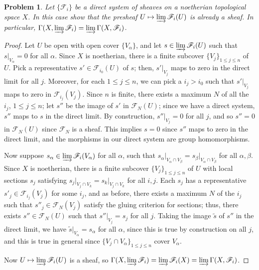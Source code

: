 \documentclass[12pt,letterpaper]{article}
\newtheorem{problem}{Problem}[section]
\theoremstyle{definition}
\theoremstyle{remark}
\numberwithin{equation}{section}
\numberwithin{figure}{problem}
\begin{document}
\begin{problem}
  Let $\{\mathscr{F}_i\}$ be a direct system of sheaves on a noetherian topological space $X$. In this case show that the presheaf $U \mapsto \varinjlim \mathscr{F}_i(U)$ is already a sheaf. In particular, $\Gamma(X,\varinjlim \mathscr{F}_i) = \varinjlim\Gamma(X,\mathscr{F}_i)$.
\end{problem}
\begin{proof}
  Let $U$ be open with open cover $\{V_\alpha\}$, and let $s \in \varinjlim\mathscr{F}_i(U)$ such that $s\vert_{V_\alpha} = 0$ for all $\alpha$. Since $X$ is noetherian, there is a finite subcover $\{V_j\}_{1\le j \le n}$ of $U$. Pick a representative $s' \in \mathscr{F}_{i_0}(U)$ of $s$; then, $s'\vert_{V_j}$ maps to zero in the direct limit for all $j$. Moreover, for each $1 \le j \le n$, we can pick a $i_j > i_0$ such that $s'\vert_{V_j}$ maps to zero in $\mathscr{F}_{i_j}(V_j)$. Since $n$ is finite, there exists a maximum $N$ of all the $i_j$, $1 \le j \le n$; let $s''$ be the image of $s'$ in $\mathscr{F}_N(U)$; since we have a direct system, $s''$ maps to $s$ in the direct limit. By construction, $s''\vert_{V_j} = 0$ for all $j$, and so $s'' = 0$ in $\mathscr{F}_N(U)$ since $\mathscr{F}_N$ is a sheaf. This implies $s = 0$ since $s''$ maps to zero in the direct limit, and the morphisms in our direct system are group homomorphisms.
  \par Now suppose $s_\alpha \in \varinjlim\mathscr{F}_i(V_\alpha)$ for all $\alpha$, such that $s_\alpha\vert_{V_\alpha \cap V_\beta} = s_\beta\vert_{V_\alpha \cap V_\beta}$ for all $\alpha,\beta$. Since $X$ is noetherian, there is a finite subcover $\{V_j\}_{1\le j \le n}$ of $U$ with local sections $s_j$ satisfying $s_j\vert_{V_j \cap V_k} = s_k\vert_{V_j\cap V_k}$ for all $i,j$. Each $s_j$ has a representative $s'_j \in \mathscr{F}_{i_j}(V_j)$ for some $i_j$, and as before, there exists a maximum $N$ of the $i_j$ such that $s''_j \in \mathscr{F}_N(V_j)$ satisfy the gluing criterion for sections; thus, there exists $s'' \in \mathscr{F}_N(U)$ such that $s'' \vert_{V_j} = s_j$ for all $j$. Taking the image $\tilde{s}$ of $s''$ in the direct limit, we have $\tilde{s}\vert_{V_\alpha} = s_\alpha$ for all $\alpha$, since this is true by construction on all $j$, and this is true in general since $\{V_j \cap V_\alpha\}_{1\le j \le n}$ cover $V_\alpha$.
  \par Now $U \mapsto \varinjlim \mathscr{F}_i(U)$ is a sheaf, so $\Gamma(X,\varinjlim \mathscr{F}_i) = \varinjlim\mathscr{F}_i(X) = \varinjlim\Gamma(X,\mathscr{F}_i)$.
\end{proof}
\end{document}
